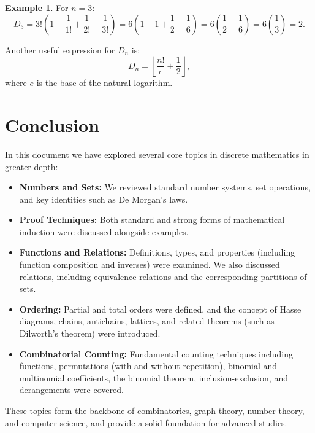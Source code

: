 \documentclass[12pt]{article}
\theoremstyle{definition}
\newtheorem{example}[theorem]{Example}
\begin{document}
\begin{example}
  For \(n=3\):
  \[
  D_3 = 3! \left(1 - \frac{1}{1!} + \frac{1}{2!} - \frac{1}{3!}\right)
  = 6\left(1 - 1 + \frac{1}{2} - \frac{1}{6}\right)
  = 6\left(\frac{1}{2} - \frac{1}{6}\right)
  = 6\left(\frac{1}{3}\right)
  = 2.
  \]
\end{example}

Another useful expression for \(D_n\) is:
\[
D_n = \left\lfloor \frac{n!}{e} + \frac{1}{2} \right\rfloor,
\]
where \(e\) is the base of the natural logarithm.

\subsection{}

\section*{Conclusion}

In this document we have explored several core topics in discrete mathematics in greater depth:
\begin{itemize}
  \item \textbf{Numbers and Sets:} We reviewed standard number systems, set operations, and key identities such as De Morgan's laws.
  \item \textbf{Proof Techniques:} Both standard and strong forms of mathematical induction were discussed alongside examples.
  \item \textbf{Functions and Relations:} Definitions, types, and properties (including function composition and inverses) were examined. We also discussed relations, including equivalence relations and the corresponding partitions of sets.
  \item \textbf{Ordering:} Partial and total orders were defined, and the concept of Hasse diagrams, chains, antichains, lattices, and related theorems (such as Dilworth's theorem) were introduced.
  \item \textbf{Combinatorial Counting:} Fundamental counting techniques including functions, permutations (with and without repetition), binomial and multinomial coefficients, the binomial theorem, inclusion-exclusion, and derangements were covered.
\end{itemize}

These topics form the backbone of combinatorics, graph theory, number theory, and computer science, and provide a solid foundation for advanced studies.
\end{document}
